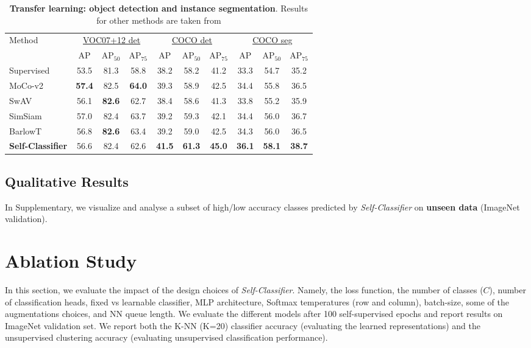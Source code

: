\documentclass[runningheads]{llncs}
\begin{document}
\begin{table}[ht]
  \centering
  \tiny
  \caption{\textbf{Transfer learning: object detection and instance segmentation}. Results for other methods are taken from \cite{DBLP:conf/icml/ZbontarJMLD21}}
  \label{table:transfer_learning}
  \begin{tabular}{l|ccc|ccc|ccc}
    \toprule
    Method & \multicolumn{3}{c}{\underline{VOC07+12 det}} & \multicolumn{3}{c}{\underline{COCO det}} & \multicolumn{3}{c}{\underline{COCO seg}} \\
     & AP & AP$_{50}$ & AP$_{75}$ & AP & AP$_{50}$ & AP$_{75}$ & AP & AP$_{50}$ & AP$_{75}$ \\
    \midrule
    Supervised & 53.5 & 81.3 & 58.8 & 38.2 & 58.2 & 41.2 & 33.3 & 54.7 & 35.2 \\
    \midrule
    MoCo-v2\cite{chen2020improved} & \textbf{57.4} & 82.5 & \textbf{64.0} & 39.3 & 58.9 & 42.5 & 34.4 & 55.8 & 36.5 \\
    SwAV\cite{caron2020unsupervised} & 56.1 & \textbf{82.6} & 62.7 & 38.4 & 58.6 & 41.3 & 33.8 & 55.2 & 35.9 \\
    SimSiam\cite{chen2021exploring} & 57.0 & 82.4 & 63.7 & 39.2 & 59.3 & 42.1 & 34.4 & 56.0 & 36.7 \\
    BarlowT\cite{DBLP:conf/icml/ZbontarJMLD21} & 56.8 & \textbf{82.6} & 63.4 & 39.2 & 59.0 & 42.5 & 34.3 & 56.0 & 36.5 \\
    \midrule
    \midrule
    \textbf{Self-Classifier} & 56.6 & 82.4 & 62.6 & \textbf{41.5} & \textbf{61.3} & \textbf{45.0} & \textbf{36.1} & \textbf{58.1} & \textbf{38.7} \\
    \bottomrule
  \end{tabular}
\end{table}

\subsection{Qualitative Results}
In Supplementary, we visualize and analyse a subset of high/low accuracy classes predicted by \textit{Self-Classifier} on \textbf{unseen data} (ImageNet validation).

\section{Ablation Study}
\label{section:ablation}
In this section, we evaluate the impact of the design choices of \textit{Self-Classifier}. Namely, the loss function, the number of classes ($C$), number of classification heads, fixed vs learnable classifier, MLP architecture, Softmax temperatures (row and column), batch-size, some of the augmentations choices, and NN queue length. We evaluate the different models after 100 self-supervised epochs and report results on ImageNet validation set. We report both the K-NN (K=20) classifier accuracy (evaluating the learned representations) and the unsupervised clustering accuracy (evaluating unsupervised classification performance).
\end{document}
